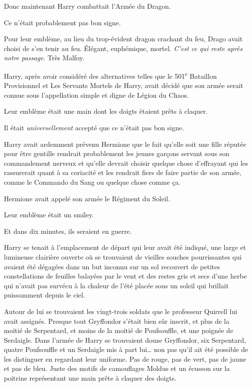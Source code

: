 Donc maintenant Harry combattait l'Armée du Dragon.

Ce n'était probablement pas bon signe.

Pour leur emblème, au lieu du trop-évident dragon crachant du feu, Drago avait choisi de s'en tenir au feu.
Élégant, euphémique, mortel.
\emph{C'est ce qui reste après notre passage}.
Très Malfoy.

Harry, après avoir considéré des alternatives telles que le 501\textsuperscript{e} Bataillon Provisionnel et Les Servants Mortels de Harry, avait décidé que son armée serait connue sous l'appellation simple et digne de Légion du Chaos.

Leur emblème était une main dont les doigts étaient prêts à claquer.

Il était \emph{universellement} accepté que ce n'était pas bon signe.

Harry avait ardemment prévenu Hermione que le fait qu'elle soit une fille réputée pour être gentille rendrait probablement les jeunes garçons servant sous son commandement nerveux et qu'elle devrait choisir quelque chose d'effrayant qui les rassurerait quant à sa coriacité et les rendrait fiers de faire partie de son armée, comme le Commando du Sang ou quelque chose comme ça.

Hermione avait appelé son armée le Régiment du Soleil.

Leur emblème était un smiley.

Et dans dix minutes, ils seraient en guerre.

Harry se tenait à l'emplacement de départ qui leur avait été indiqué, une large et lumineuse clairière ouverte où se trouvaient de vieilles souches pourrissantes qui avaient été dégagées dans un but inconnu sur un sol recouvert de petites constellations de feuilles balayées par le vent et des restes gris et secs d'une herbe qui n'avait pas survécu à la chaleur de l'été placée sous un soleil qui brillait puissamment depuis le ciel.

Autour de lui se trouvaient les vingt-trois soldats que le professeur Quirrell lui avait assignés.
Presque tout Gryffondor s'était bien sûr inscrit, et plus de la moitié de Serpentard, et moins de la moitié de Poufsouffle, et une poignée de Serdaigle.
Dans l'armée de Harry se trouvaient douze Gryffondor, six Serpentard, quatre Poufsouffle et un Serdaigle mis à part lui… non pas qu'il ait été possible de les distinguer en regardant leur uniforme.
Pas de rouge, pas de vert, pas de jaune et pas de bleu.
Juste des motifs de camouflages Moldus et un écusson sur la poitrine représentant une main prête à claquer des doigts.

